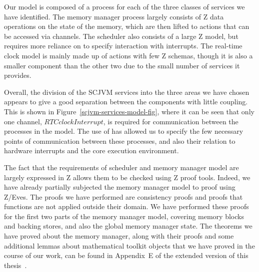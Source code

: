 Our model is composed of a \Circus{} process for each of the three
classes of services we have identified.
The memory manager process largely consists of Z data operations on
the state of the memory, which are then lifted to \Circus{} actions
that can be accessed via channels.
The scheduler also consists of a large Z model, but requires more
reliance on \Circus{} to specify interaction with interrupts.
The real-time clock model is mainly made up of \Circus{} actions with
few Z schemas, though it is also a smaller component than the other
two due to the small number of services it provides.

Overall, the division of the SCJVM services into the three areas we
have chosen appears to give a good separation between the components
with little coupling.
This is shown in Figure~\ref{scjvm-services-model-fig}, where it can
be seen that only one channel, $RTCclockInterrupt$, is required for
communication between the processes in the model.
The use of \Circus{} has allowed us to specify the few necessary
points of communication between these processes, and also their
relation to hardware interrupts and the core execution environment.

The fact that the requirements of scheduler and memory manager model
are largely expressed in Z allows them to be checked using Z proof
tools.
Indeed, we have already partially subjected the memory manager model
to proof using Z/Eves.
The proofs we have performed are consistency proofs and proofs that
functions are not applied outside their domain.
We have performed these proofs for the first two parts of the memory
manager model, covering memory blocks and backing stores, and also the
global memory manager state.
The theorems we have proved about the memory manager, along with their
proofs and some additional lemmas about mathematical toolkit objects
that we have proved in the course of our work, can be found in
Appendix~E of the extended version of this
thesis~\cite{baxter2018-extended}.

